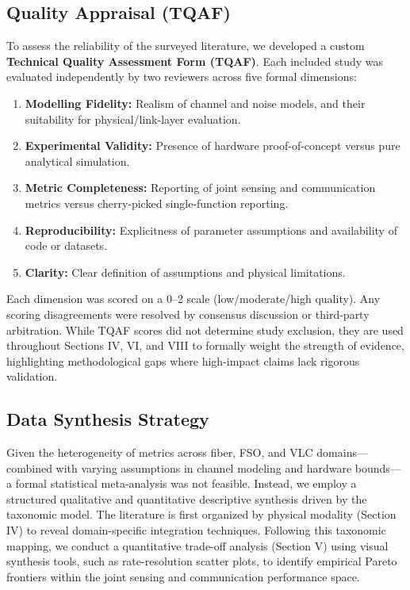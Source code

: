 \documentclass[lettersize,journal]{IEEEtran}
\begin{document}
\subsection{Quality Appraisal (TQAF)}
To assess the reliability of the surveyed literature, we developed a custom \textbf{Technical Quality Assessment Form (TQAF)}. Each included study was evaluated independently by two reviewers across five formal dimensions:
\begin{enumerate}
    \item \textbf{Modelling Fidelity:} Realism of channel and noise models, and their suitability for physical/link-layer evaluation.
    \item \textbf{Experimental Validity:} Presence of hardware proof-of-concept versus pure analytical simulation.
    \item \textbf{Metric Completeness:} Reporting of joint sensing and communication metrics versus cherry-picked single-function reporting.
    \item \textbf{Reproducibility:} Explicitness of parameter assumptions and availability of code or datasets.
    \item \textbf{Clarity:} Clear definition of assumptions and physical limitations.
\end{enumerate}

Each dimension was scored on a 0--2 scale (low/moderate/high quality). Any scoring disagreements were resolved by consensus discussion or third-party arbitration. While TQAF scores did not determine study exclusion, they are used throughout Sections IV, VI, and VIII to formally weight the strength of evidence, highlighting methodological gaps where high-impact claims lack rigorous validation.

\subsection{Data Synthesis Strategy}
Given the heterogeneity of metrics across fiber, FSO, and VLC domains---combined with varying assumptions in channel modeling and hardware bounds---a formal statistical meta-analysis was not feasible. Instead, we employ a structured qualitative and quantitative descriptive synthesis driven by the taxonomic model. The literature is first organized by physical modality (Section IV) to reveal domain-specific integration techniques. Following this taxonomic mapping, we conduct a quantitative trade-off analysis (Section V) using visual synthesis tools, such as rate-resolution scatter plots, to identify empirical Pareto frontiers within the joint sensing and communication performance space.
\end{document}

